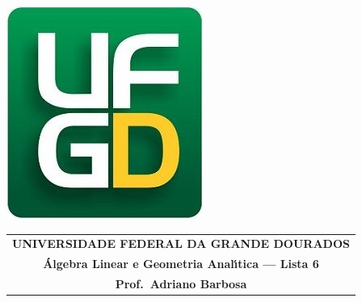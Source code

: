 \documentclass[a4paper,5pt]{amsbook}
\begin{document}
\thispagestyle{empty}
\pagestyle{empty}
\begin{minipage}[h]{0.14\textwidth}
	\includegraphics[scale=0.24]{../../ufgd.png}
\end{minipage}
\begin{minipage}[h]{\textwidth}
\begin{tabular}{c}
{{\bf UNIVERSIDADE FEDERAL DA GRANDE DOURADOS}}\\
{{\bf \'{A}lgebra Linear e Geometria Anal\'{\i}tica --- Lista 6}}\\
{{\bf Prof.\ Adriano Barbosa}}\\
\end{tabular}
\vspace{-0.45cm}
%
\end{minipage}

\end{document}

